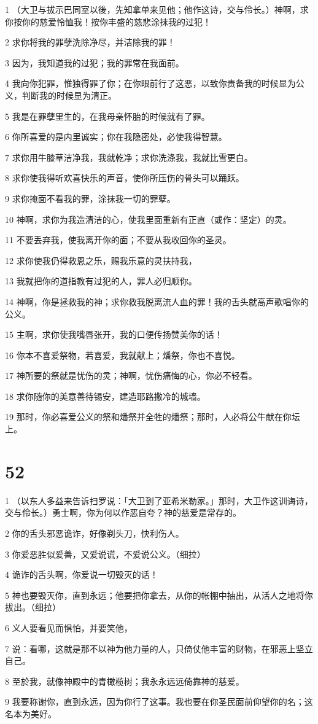\par 1 （大卫与拔示巴同室以後，先知拿单来见他；他作这诗，交与伶长。）神啊，求你按你的慈爱怜恤我！按你丰盛的慈悲涂抹我的过犯！
\par 2 求你将我的罪孽洗除净尽，并洁除我的罪！
\par 3 因为，我知道我的过犯；我的罪常在我面前。
\par 4 我向你犯罪，惟独得罪了你；在你眼前行了这恶，以致你责备我的时候显为公义，判断我的时候显为清正。
\par 5 我是在罪孽里生的，在我母亲怀胎的时候就有了罪。
\par 6 你所喜爱的是内里诚实；你在我隐密处，必使我得智慧。
\par 7 求你用牛膝草洁净我，我就乾净；求你洗涤我，我就比雪更白。
\par 8 求你使我得听欢喜快乐的声音，使你所压伤的骨头可以踊跃。
\par 9 求你掩面不看我的罪，涂抹我一切的罪孽。
\par 10 神啊，求你为我造清洁的心，使我里面重新有正直（或作：坚定）的灵。
\par 11 不要丢弃我，使我离开你的面；不要从我收回你的圣灵。
\par 12 求你使我仍得救恩之乐，赐我乐意的灵扶持我，
\par 13 我就把你的道指教有过犯的人，罪人必归顺你。
\par 14 神啊，你是拯救我的神；求你救我脱离流人血的罪！我的舌头就高声歌唱你的公义。
\par 15 主啊，求你使我嘴唇张开，我的口便传扬赞美你的话！
\par 16 你本不喜爱祭物，若喜爱，我就献上；燔祭，你也不喜悦。
\par 17 神所要的祭就是忧伤的灵；神啊，忧伤痛悔的心，你必不轻看。
\par 18 求你随你的美意善待锡安，建造耶路撒冷的城墙。
\par 19 那时，你必喜爱公义的祭和燔祭并全牲的燔祭；那时，人必将公牛献在你坛上。

\chapter{52}

\par 1 （以东人多益来告诉扫罗说：「大卫到了亚希米勒家。」那时，大卫作这训诲诗，交与伶长。）勇士啊，你为何以作恶自夸？神的慈爱是常存的。
\par 2 你的舌头邪恶诡诈，好像剃头刀，快利伤人。
\par 3 你爱恶胜似爱善，又爱说谎，不爱说公义。（细拉）
\par 4 诡诈的舌头啊，你爱说一切毁灭的话！
\par 5 神也要毁灭你，直到永远；他要把你拿去，从你的帐棚中抽出，从活人之地将你拔出。（细拉）
\par 6 义人要看见而惧怕，并要笑他，
\par 7 说：看哪，这就是那不以神为他力量的人，只倚仗他丰富的财物，在邪恶上坚立自己。
\par 8 至於我，就像神殿中的青橄榄树；我永永远远倚靠神的慈爱。
\par 9 我要称谢你，直到永远，因为你行了这事。我也要在你圣民面前仰望你的名；这名本为美好。

